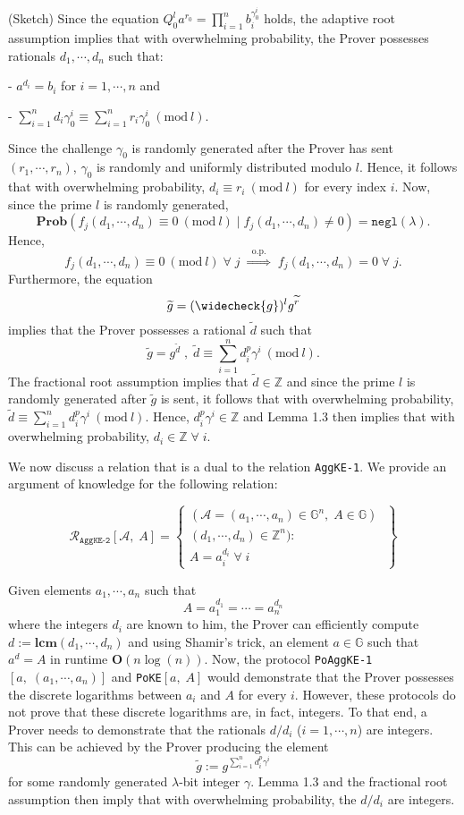 \documentclass[11pt, lettersize, notitlepage, leqno, footskip=0.6cm]{article}
\newcommand{\bz}{\mathbb Z}
\newcommand{\pl}{\prod\limits}
\newcommand{\slim}{\sum\limits}
\newcommand{\ttt}{\texttt}
\newcommand{\negl}{\ttt{{negl}}}
\newcommand{\impop}{\overset{\;\;\mr{o.p.}\;\;}{\Longrightarrow}}
\newcommand{\wti}{\widetilde}
\newcommand{\mc}{\mathcal}
\newcommand{\mb}{\mathbb}
\newcommand{\mbf}{\mathbf}
\newcommand{\mr}{\mathrm}
\newcommand{\lam}{\lambda}
\newcommand{\weck}{\widecheck}
\newcommand{\Prob}{\mbf{Prob}}
\newcommand{\vs}{\vspace{-0.15cm}}
\newcommand{\noin}{\noindent}
\newcommand{\op}{overwhelming probability}
\newcommand{\Mod}[1]{\ (\mathrm{mod}\ #1)}
\newcommand{\LCM}{\mbf{lcm}}
\numberwithin{equation}{section}
\begin{document}
\begin{prf} (Sketch) Since the equation $Q_0^l a^{r_0} = \pl_{i=1}^n b_i^{\gamma_0^i}$ holds, the adaptive root assumption implies that with \op, the Prover possesses rationals $d_1,\cdots,d_n$ such that: 

\noin - $a^{d_i} = b_i$ for $i=1,\cdots,n$ and 

\noin - $\sum\limits_{i=1}^n d_i\gamma_0^i\equiv \sum\limits_{i=1}^n r_i\gamma_0^i\Mod{l}.$ 

Since the challenge $\gamma_0$ is randomly generated after the Prover has sent $(r_1,\cdots,r_n)$, $\gamma_0$ is randomly and uniformly distributed modulo $l$. Hence, it follows that with \op, $d_i\equiv r_i\Mod{l}$ for every index $i$. Now, since the prime $l$ is randomly generated, \vs $$\Prob\left(f_j(d_1,\cdots,d_n)\equiv 0\Mod{l} \;\Big|\; f_j(d_1,\cdots,d_n)\neq 0 \right) = \negl(\lam) .$$ Hence, $$f_j(d_1,\cdots,d_n)\equiv 0\Mod{l}\;\forall\;j\;\impop\; f_j(d_1,\cdots,d_n) = 0 \;\forall\;j.$$ Furthermore, the equation \vs $$\wti{g} = (\weck{g})^lg^{\wti{r}} $$ implies that the Prover possesses a rational $\wti{d}$ such that \vs $$\wti{g} = g^{\wti{d}}\;,\;\wti{d}\equiv \slim_{i=1}^n d_i^p\gamma^i\Mod{l}.$$ The fractional root assumption implies that $\wti{d}\in\bz$ and since the prime $l$ is randomly generated after $\wti{g}$ is sent, it follows that with \op, $\wti{d}\equiv \slim_{i=1}^n d_i^p\gamma^i\Mod{l}.$ Hence, $d_i^p\gamma^i\in \bz$ and Lemma 1.3 then implies that with \op, $d_i\in \bz\;\forall\;i$. \end{prf} 


\noindent We now discuss a relation that is a dual to the relation \verb|AggKE-1|. We provide an argument of knowledge for the following relation: 

\[
  \mc{R}_{{\ttt{AggKE-2}}}[\mc{A},\;A] = \left\{\begin{array}{l}
    (\mc{A} = (a_1,\cdots, a_n)\in \mb{G}^n,\; A\in\mb{G})\;\\ 
    (d_1,\cdots,d_n)\in\bz^n) :  \\
     A = a_i^{d_i}\;\forall\; i
  \end{array}\right\}
\]
\vspace{0.1cm}

\noin Given elements $a_1,\cdots,a_n$ such that \vs $$A = a_1^{d_1} =\cdots = a_n^{d_n} $$ where the integers $d_i$ are known to him, the Prover can efficiently compute $d:= \LCM(d_1,\cdots,d_n)$ and  using Shamir's trick, an element $a\in\mb{G}$ such that $a^d = A$ in runtime $\mbf{O}(n\log(n))$. Now, the protocol \verb|PoAggKE-1|$[a,\;(a_1,\cdots,a_n)]$ and \verb|PoKE|$[a,\;A]$ would demonstrate that the Prover possesses the discrete logarithms between $a_i$ and $A$ for every $i$. However, these protocols do not prove that these discrete logarithms are, in fact, integers. To that end, a Prover needs to demonstrate that the rationals $d/d_i$ ($i=1,\cdots, n$) are integers. This can be achieved by the Prover producing the element \vs $$\wti{g} := g^{\slim_{i=1}^{n}d_i^{p}\gamma^i} $$ for some randomly generated $\lam$-bit integer $\gamma$. Lemma 1.3 and the fractional root assumption then imply that with overwhelming probability, the $d/d_i$ are integers.
\end{document}
